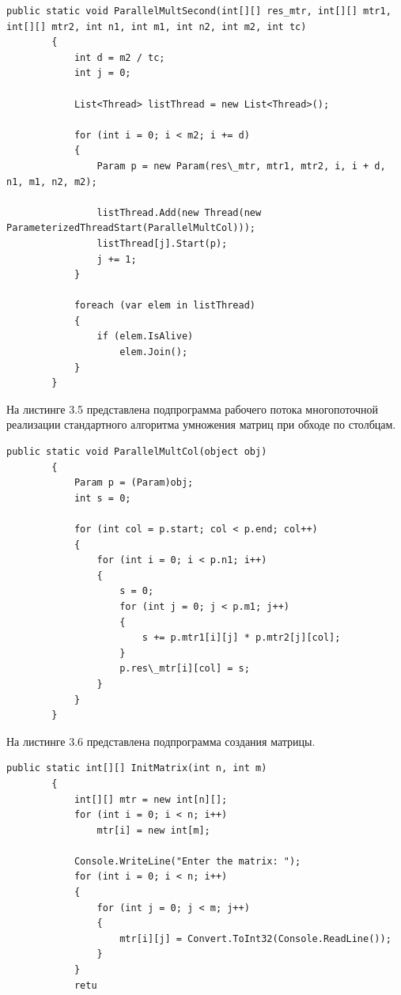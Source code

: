 \documentclass[12pt]{report}
\begin{document}
\begin{lstlisting}[label=some-code,caption= Подпрограмма главного потока многопоточной реализации стандартного алгоритма умножения матриц (обход по столбцам)]
public static void ParallelMultSecond(int[][] res_mtr, int[][] mtr1, int[][] mtr2, int n1, int m1, int n2, int m2, int tc)
        {
            int d = m2 / tc;
            int j = 0;

            List<Thread> listThread = new List<Thread>();

            for (int i = 0; i < m2; i += d)
            {
                Param p = new Param(res\_mtr, mtr1, mtr2, i, i + d, n1, m1, n2, m2);
                
                listThread.Add(new Thread(new ParameterizedThreadStart(ParallelMultCol)));
                listThread[j].Start(p); 
                j += 1;
            }

            foreach (var elem in listThread)
            {
                if (elem.IsAlive)
                    elem.Join();
            }
        }
\end{lstlisting}

На листинге 3.5 представлена подпрограмма рабочего потока многопоточной реализации стандартного алгоритма умножения матриц при обходе по столбцам.

\begin{lstlisting}[label=some-code,caption= Подпрограмма рабочего потока многопоточной реализации стандартного алгоритма умножения матриц (обход по столбцам)]
public static void ParallelMultCol(object obj)
        {
            Param p = (Param)obj;
            int s = 0;

            for (int col = p.start; col < p.end; col++)
            {
                for (int i = 0; i < p.n1; i++)
                {
                    s = 0;
                    for (int j = 0; j < p.m1; j++)
                    {
                        s += p.mtr1[i][j] * p.mtr2[j][col];
                    }
                    p.res\_mtr[i][col] = s;
                }
            }
        }
 \end{lstlisting}

На листинге 3.6 представлена подпрограмма создания матрицы.

\begin{lstlisting}[label=some-code,caption=Подпрограмма создания матрицы]
public static int[][] InitMatrix(int n, int m)
        {
            int[][] mtr = new int[n][];
            for (int i = 0; i < n; i++)
                mtr[i] = new int[m];

            Console.WriteLine("Enter the matrix: ");
            for (int i = 0; i < n; i++)
            {
                for (int j = 0; j < m; j++)
                {
                    mtr[i][j] = Convert.ToInt32(Console.ReadLine());
                }
            }
            retu

\end{lstlisting}
\end{document}
